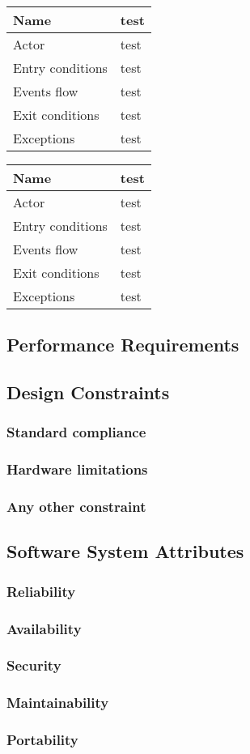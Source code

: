 \begin{table}[]
\begin{tabular}{|l|l|}
\hline
Name             & test \\ \hline
Actor            & test \\ \hline
Entry conditions & test \\ \hline
Events flow      & test \\ \hline
Exit conditions  & test \\ \hline
Exceptions       & test\\ \hline
\end{tabular}
\end{table}

\begin{table}[]
\begin{tabular}{|l|l|}
\hline
Name             & test \\ \hline
Actor            & test \\ \hline
Entry conditions & test \\ \hline
Events flow      & test \\ \hline
Exit conditions  & test \\ \hline
Exceptions       & test\\ \hline
\end{tabular}
\end{table}

\subsection{Performance Requirements}
\subsection{Design Constraints}
\subsubsection{Standard compliance}
\subsubsection{Hardware limitations}
\subsubsection{Any other constraint}
\subsection{Software System Attributes}
\subsubsection{Reliability}
\subsubsection{Availability}
\subsubsection{Security}
\subsubsection{Maintainability}
\subsubsection{Portability}
